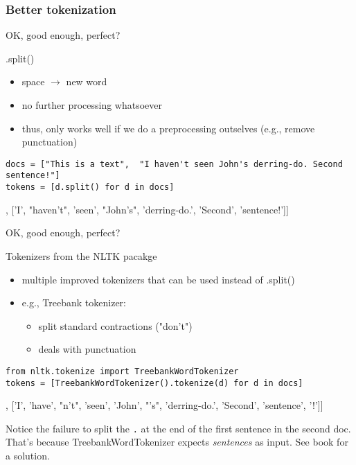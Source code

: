 \subsubsection{Better tokenization}

\begin{frame}[fragile]{OK, good enough, perfect?}
\begin{block}{.split()}
\begin{itemize}
	\item space $\rightarrow$ new word
	\item no further processing whatsoever
	\item thus, only works well if we do a preprocessing outselves (e.g., remove punctuation)
\end{itemize}
\end{block}
\begin{lstlisting}
docs = ["This is a text",  "I haven't seen John's derring-do. Second sentence!"]
tokens = [d.split() for d in docs]
\end{lstlisting}
\begin{lstlistingoutputtiny}
[['This', 'is', 'a', 'text'], ['I', "haven't", 'seen', "John's", 'derring-do.', 'Second', 'sentence!']]
\end{lstlistingoutputtiny}
\end{frame}


\begin{frame}[fragile]{OK, good enough, perfect?}
	\begin{block}{Tokenizers from the NLTK pacakge}
		\begin{itemize}
			\item multiple improved tokenizers that can be used instead of .split()
			\item e.g., Treebank tokenizer:
			\begin{itemize}
				\item split standard contractions ("don't")
				\item deals with punctuation
			\end{itemize}			
		\end{itemize}
	\end{block}
\begin{lstlisting}
from nltk.tokenize import TreebankWordTokenizer
tokens = [TreebankWordTokenizer().tokenize(d) for d in docs]
\end{lstlisting}
\begin{lstlistingoutputtiny}
[['This', 'is', 'a', 'text'],  ['I', 'have', "n't", 'seen', 'John', "'s", 'derring-do.', 'Second', 'sentence', '!']]
\end{lstlistingoutputtiny}
\tiny{Notice the failure to split the \texttt{.} at the end of the first sentence in the second doc. That's because TreebankWordTokenizer expects \emph{sentences} as input. See book for a solution.\\}
\end{frame}


